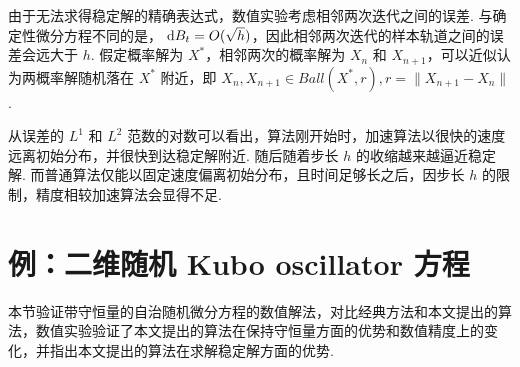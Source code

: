 由于无法求得稳定解的精确表达式，数值实验考虑相邻两次迭代之间的误差. 与确定性微分方程不同的是，$\text{ d} B_t = O(\sqrt{h})$，因此相邻两次迭代的样本轨道之间的误差会远大于 $h$. 假定概率解为 $X^*$，相邻两次的概率解为 $X_n$ 和 $X_{n+1}$，可以近似认为两概率解随机落在 $X^*$ 附近，即 $X_n,X_{n+1} \in Ball(X^*,r),r = \|X_{n+1} - X_n\|$. 


从误差的 $L^1$ 和 $L^2$ 范数的对数可以看出，算法刚开始时，加速算法以很快的速度远离初始分布，并很快到达稳定解附近. 随后随着步长 $h$ 的收缩越来越逼近稳定解. 而普通算法仅能以固定速度偏离初始分布，且时间足够长之后，因步长 $h$ 的限制，精度相较加速算法会显得不足. 






\section{例：二维随机 Kubo oscillator 方程}
本节验证带守恒量的自治随机微分方程的数值解法，对比经典方法和本文提出的算法，数值实验验证了本文提出的算法在保持守恒量方面的优势和数值精度上的变化，并指出本文提出的算法在求解稳定解方面的优势. 

